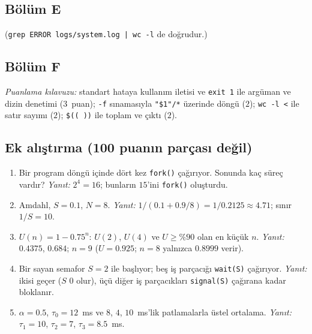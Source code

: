 \documentclass[11pt,a4paper]{article}
\newcommand{\cmd}[1]{\texttt{#1}}
\begin{document}
\subsection*{Bölüm E}

(\cmd{grep ERROR logs/system.log | wc -l} de doğrudur.)



\subsection*{Bölüm F}


\textit{Puanlama kılavuzu:} standart hataya kullanım iletisi ve \texttt{exit 1} ile argüman ve dizin denetimi ($3$~puan); \texttt{-f} sınamasıyla \texttt{"\$1"/*} üzerinde döngü ($2$); \cmd{wc -l <} ile satır sayımı ($2$); \texttt{\$(( ))} ile toplam ve çıktı ($2$).

\subsection*{Ek alıştırma (100 puanın parçası değil)}
\begin{enumerate}[leftmargin=1.6em]
  \item Bir program döngü içinde dört kez \cmd{fork()} çağırıyor. Sonunda kaç süreç vardır? \emph{Yanıt:} $2^{4} = 16$; bunların $15$'ini \cmd{fork()} oluşturdu.
  \item Amdahl, $S = 0.1$, $N = 8$. \emph{Yanıt:} $1/(0.1 + 0.9/8) = 1/0.2125 \approx 4.71$; sınır $1/S = 10$.
  \item $U(n) = 1 - 0.75^{n}$: $U(2)$, $U(4)$ ve $U \ge \%90$ olan en küçük $n$. \emph{Yanıt:} $0.4375$, $0.684$; $n = 9$ ($U = 0.925$; $n = 8$ yalnızca $0.8999$ verir).
  \item Bir sayan semafor $S = 2$ ile başlıyor; beş iş parçacığı \texttt{wait(S)} çağırıyor. \emph{Yanıt:} ikisi geçer ($S$ $0$ olur), üçü diğer iş parçacıkları \texttt{signal(S)} çağırana kadar bloklanır.
  \item $\alpha = 0.5$, $\tau_0 = 12$~ms ve $8$, $4$, $10$~ms'lik patlamalarla üstel ortalama. \emph{Yanıt:} $\tau_1 = 10$, $\tau_2 = 7$, $\tau_3 = 8.5$~ms.
\end{enumerate}

\end{document}
